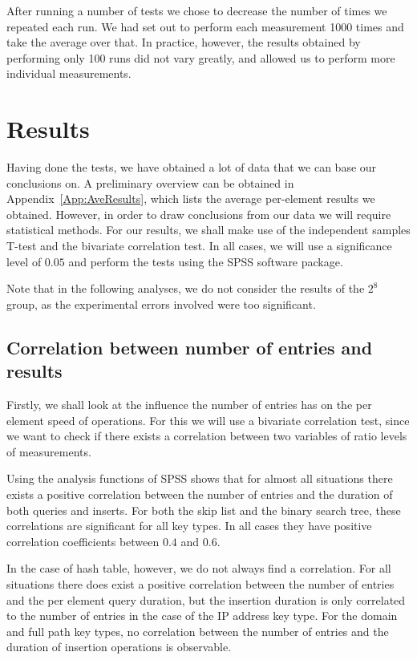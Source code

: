 \documentclass[12pt,a4paper]{article}
\begin{document}
    After running a number of tests we chose to decrease the number of times we repeated each run.
    We had set out to perform each measurement 1000 times and take the average over that.  In
    practice, however, the results obtained by performing only 100 runs did not vary greatly, and
    allowed us to perform more individual measurements.


    \section{Results}

    Having done the tests, we have obtained a lot of data that we can base our conclusions on.  A
    preliminary overview can be obtained in Appendix~\ref{App:AveResults}, which lists the average
    per-element results we obtained.  However, in order to draw conclusions from our data we will
    require statistical methods.  For our results, we shall make use of the independent samples
    T-test and the bivariate correlation test.  In all cases, we will use a significance level of
    $0.05$ and perform the tests using the SPSS software package.

    Note that in the following analyses, we do not consider the results of the $2^8$ group, as the
    experimental errors involved were too significant.

    \subsection{Correlation between number of entries and results}

    Firstly, we shall look at the influence the number of entries has on the per element speed of
    operations.  For this we will use a bivariate correlation test, since we want to check if there
    exists a correlation between two variables of ratio levels of measurements.

    Using the analysis functions of SPSS shows that for almost all situations there exists a
    positive correlation between the number of entries and the duration of both queries and inserts.
    For both the skip list and the binary search tree, these correlations are significant for all
    key types. In all cases they have positive correlation coefficients between $0.4$ and $0.6$.

    In the case of hash table, however, we do not always find a correlation.  For all situations there does
    exist a positive correlation between the number of entries and the per element query duration, but
    the insertion duration is only correlated to the number of entries in the case of the IP address
    key type.  For the domain and full path key types, no correlation between the number of entries
    and the duration of insertion operations is observable.
\end{document}

